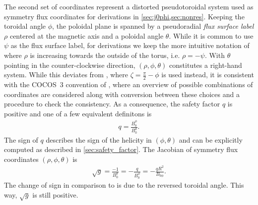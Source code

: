 The second set of coordinates represent a distorted pseudotoroidal system used as symmetry flux coordinates for derivations in \cref{sec:j0phi,sec:nonres}. Keeping the toroidal angle $\phi$, the poloidal plane is spanned by a pseudoradial \emph{flux surface label} $\rho$ centered at the magnetic axis and a poloidal angle $\theta$. While it is common to use $\psi$ as the flux surface label, for derivations we keep the more intuitive notation of \textcite{dHaeseleer91} where $\rho$ is increasing towards the outside of the torus, i.e. $\rho = -\psi$. With $\theta$ pointing in the counter-clockwise direction, $(\rho, \phi, \theta)$ constitutes a right-hand system. While this deviates from \textcite{dHaeseleer91}, where $\zeta = \frac{\pi}{2} - \phi$ is used instead, it is consistent with the COCOS~3 convention of \textcite{Sauter13}, where an overview of possible combinations of coordinates are considered along with conversion between these choices and a procedure to check the consistency. As a consequence, the safety factor $q$ is positive and one of a few equivalent definitons is
\begin{gather}
  q = \frac{B_{0}^{\phi}}{B_{0}^{\theta}}. \label{eq:q_field_line_pitch}
\end{gather}
The sign of $q$ describes the sign of the helicity in $(\phi, \theta)$ and can be explicitly computed as described in \cref{sec:safety_factor}. The Jacobian of symmetry flux coordinates $(\rho, \phi, \theta)$ is
\begin{gather}
  \sqrt{g} = \frac{-1}{B_{0}^{\theta}} = -\frac{q}{B_{0}^{\phi}} = -\frac{q R^{2}}{B_{0 \phi}}. \label{eq:flux_metric}
\end{gather}
The change of sign in comparison to \textcite{dHaeseleer91} is due to the reversed toroidal angle. This way, $\sqrt{g}$ is still positive.


